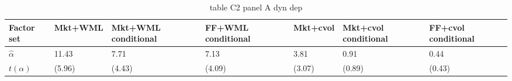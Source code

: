 \begin{table}[htbp]
  \centering
  \caption{table C2 panel A dyn dep}
  \label{tab:table_C2_panel_A_dyn_dep}
  \begin{tabular}{lllllll}
\toprule
Factor set & Mkt+WML & Mkt+WML conditional & FF+WML conditional & Mkt+cvol & Mkt+cvol conditional & FF+cvol conditional \\
\midrule
$\hat{\alpha}$ & 11.43 & 7.71 & 7.13 & 3.81 & 0.91 & 0.44 \\
$t(\alpha)$ & (5.96) & (4.43) & (4.09) & (3.07) & (0.89) & (0.43) \\
\bottomrule
\end{tabular}

\end{table}
